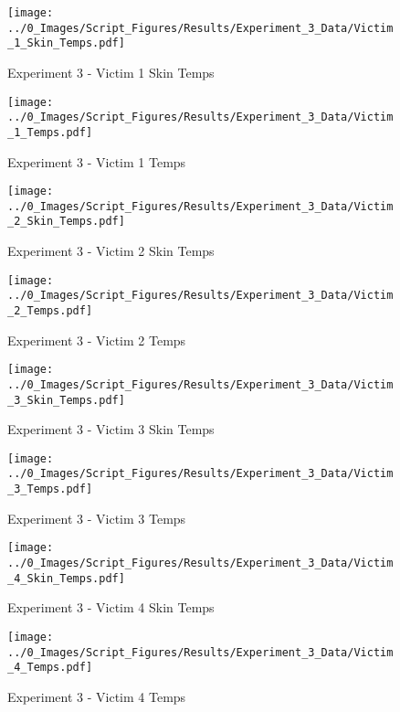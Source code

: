 	\clearpage

	\begin{figure}[H]
		\centering
		\texttt{[image: ../0\_Images/Script\_Figures/Results/Experiment\_3\_Data/Victim\_1\_Skin\_Temps.pdf]}
		\caption[]{Experiment 3 - Victim 1 Skin Temps}
	\end{figure}
 

	\begin{figure}[H]
		\centering
		\texttt{[image: ../0\_Images/Script\_Figures/Results/Experiment\_3\_Data/Victim\_1\_Temps.pdf]}
		\caption[]{Experiment 3 - Victim 1 Temps}
	\end{figure}
 
	\clearpage

	\begin{figure}[H]
		\centering
		\texttt{[image: ../0\_Images/Script\_Figures/Results/Experiment\_3\_Data/Victim\_2\_Skin\_Temps.pdf]}
		\caption[]{Experiment 3 - Victim 2 Skin Temps}
	\end{figure}
 

	\begin{figure}[H]
		\centering
		\texttt{[image: ../0\_Images/Script\_Figures/Results/Experiment\_3\_Data/Victim\_2\_Temps.pdf]}
		\caption[]{Experiment 3 - Victim 2 Temps}
	\end{figure}
 
	\clearpage

	\begin{figure}[H]
		\centering
		\texttt{[image: ../0\_Images/Script\_Figures/Results/Experiment\_3\_Data/Victim\_3\_Skin\_Temps.pdf]}
		\caption[]{Experiment 3 - Victim 3 Skin Temps}
	\end{figure}
 

	\begin{figure}[H]
		\centering
		\texttt{[image: ../0\_Images/Script\_Figures/Results/Experiment\_3\_Data/Victim\_3\_Temps.pdf]}
		\caption[]{Experiment 3 - Victim 3 Temps}
	\end{figure}
 
	\clearpage

	\begin{figure}[H]
		\centering
		\texttt{[image: ../0\_Images/Script\_Figures/Results/Experiment\_3\_Data/Victim\_4\_Skin\_Temps.pdf]}
		\caption[]{Experiment 3 - Victim 4 Skin Temps}
	\end{figure}
 

	\begin{figure}[H]
		\centering
		\texttt{[image: ../0\_Images/Script\_Figures/Results/Experiment\_3\_Data/Victim\_4\_Temps.pdf]}
		\caption[]{Experiment 3 - Victim 4 Temps}
	\end{figure}
 
